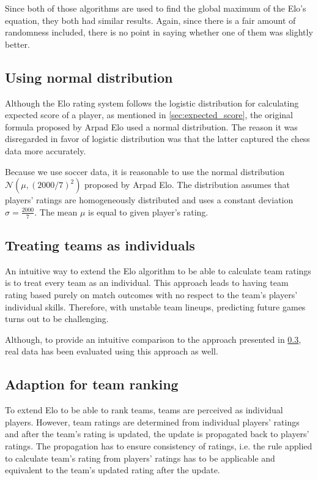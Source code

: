 Since both of those algorithms are used to find the global maximum of the Elo's equation, they both had similar results. Again, since there is a fair amount of randomness included, there is no point in saying whether one of them was slightly better.

\subsection{Using normal distribution}
Although the Elo rating system follows the logistic distribution for calculating expected score of a player, as mentioned in \ref{sec:expected_score}, the original formula proposed by Arpad Elo used a normal distribution. The reason it was disregarded in favor of logistic distribution was that the latter captured the chess data more accurately.

Because we use soccer data, it is reasonable to use the normal distribution $\mathcal{N}(\mu, (2000/7)^2)$ proposed by Arpad Elo. The distribution assumes that players' ratings are homogeneously distributed and uses a constant deviation $\sigma=\frac{2000}{7}$. The mean $\mu$ is equal to given player's rating.

\subsection{Treating teams as individuals}
An intuitive way to extend the Elo algorithm to be able to calculate team ratings is to treat every team as an individual. This approach leads to having team rating based purely on match outcomes with no respect to the team's players' individual skills. Therefore, with unstable team lineups, predicting future games turns out to be challenging. 

Although, to provide an intuitive comparison to the approach presented in \ref{sec:elo_team_ranking}, real data has been evaluated using this approach as well.

\subsection{Adaption for team ranking}
\label{sec:elo_team_ranking}
To extend Elo to be able to rank teams, teams are perceived as individual players. However, team ratings are determined from individual players' ratings and after the team's rating is updated, the update is propagated back to players' ratings. The propagation has to ensure consistency of ratings, i.e. the rule applied to calculate team's rating from players' ratings has to be applicable and equivalent to the team's updated rating after the update.

